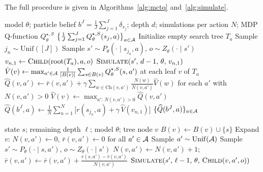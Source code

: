The full procedure is given in Algorithms~\ref{alg:mctq} and~\ref{alg:simulate}.

\begin{algorithm}[t]
\caption[Finite-depth Monte Carlo belief-tree planning with QMDP leaf bootstrapping]{}
\label{alg:mctq}
\begin{algorithmic}[1]
\Require model $\theta$; particle belief $b^J=\frac{1}{J}\sum_{j=1}^J\delta_{s_j}$; depth $d$; simulations per action $N$; MDP Q-function $Q_\theta^{\star,S}$
 
    \State\Return $\bigl\{\frac1J\sum_{j=1}^J Q_\theta^{\star,S}(s_j,a)\bigr\}_{a\in{\mathcal{A}}}$
\EndIf
{} 
    \State Initialize empty search tree $T_a$
     
        \State Sample $j_n\sim\mathrm{Unif}([J])$
        \State Sample $s'\sim P_\theta(\cdot\mid s_{j_n},a)$, $o\sim Z_\theta(\cdot\mid s')$
        \State $v_{n,1}\gets\textsc{Child}(\mathrm{root}(T_a),a,o)$ 
        \State $\textsc{Simulate}(s',\,d-1,\,\theta,\,v_{n,1})$ 
    \EndFor
    \State {}
    \State $\hat V(v)\gets\max_{a'\in{\mathcal{A}}}\frac{1}{|B(v)|}\sum_{s\in B(v)}Q_\theta^{\star,S}(s,a')$ at each leaf $v$ of $T_a$ 
        \State $\hat Q(v,a')\gets\bar r(v,a')+\gamma\sum_{w\in\mathrm{Ch}(v,a')}\frac{N(w)}{N(v,a')}\hat V(w)$ for each $a'$ with $N(v,a')>0$
        \State $\hat V(v)\gets\max_{a':\,N(v,a')>0}\hat Q(v,a')$
    \EndFor
    \State $\widehat Q(b^J,a)\gets\frac{1}{N}\sum_{n=1}^N\bigl[r(s_{j_n},a)+\gamma\,\hat V(v_{n,1})\bigr]$
\EndFor
\State\Return $\{\widehat Q(b^J,a)\}_{a\in{\mathcal{A}}}$
\end{algorithmic}
\end{algorithm}

\begin{algorithm}[t]
\caption[\textsc{Simulate}: recursive uniform-exploration descent to full depth]{\textsc{Simulate}: Recursive uniform-exploration descent to full depth}
\label{alg:simulate}
\begin{algorithmic}[1]
\Require state $s$; remaining depth $\ell$; model $\theta$; tree node $v$
\State $B(v)\gets B(v)\cup\{s\}$ 
 
    \State\Return
\EndIf
{} 
    \State Expand $v$: $N(v,a')\gets 0$, $\bar r(v,a')\gets 0$ for all $a'\in{\mathcal{A}}$
\EndIf
\State Sample $a'\sim\mathrm{Unif}({\mathcal{A}})$ 
\State Sample $s'\sim P_\theta(\cdot\mid s,a')$, $o\sim Z_\theta(\cdot\mid s')$
\State $N(v,a')\gets N(v,a')+1$; $\bar r(v,a')\gets\bar r(v,a')+\frac{r(s,a')-\bar r(v,a')}{N(v,a')}$ 
\State $\textsc{Simulate}(s',\,\ell-1,\,\theta,\,\textsc{Child}(v,a',o))$
\end{algorithmic}
\end{algorithm}

